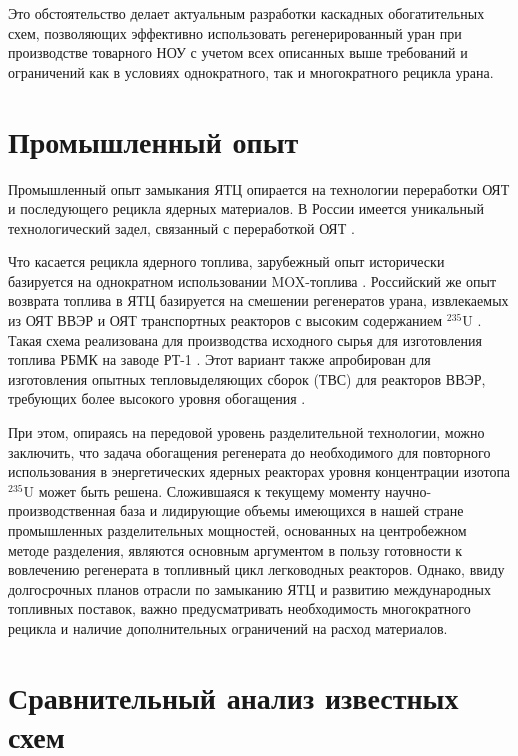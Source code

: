 Это обстоятельство делает актуальным разработки каскадных обогатительных схем, позволяющих эффективно использовать регенерированный уран при производстве товарного НОУ с учетом всех описанных выше требований и ограничений как в условиях однократного, так и многократного рецикла урана.

\section{Промышленный опыт}\label{sec:ch1/sec1}
Промышленный опыт замыкания ЯТЦ опирается на технологии переработки ОЯТ и последующего рецикла ядерных материалов.
В России имеется уникальный технологический задел, связанный с переработкой ОЯТ \cite{balihinSostoyaniiPerspektivahRazvitiya2018, efimenkoProblemyPerspektivyRazvitiya2017}.

Что касается рецикла ядерного топлива, зарубежный опыт исторически базируется на однократном использовании MOX-топлива \cite{international2003iaea}.
Российский же опыт возврата топлива в ЯТЦ базируется на смешении регенератов урана, извлекаемых из ОЯТ ВВЭР и ОЯТ транспортных реакторов с высоким содержанием $^{235}$U \cite{international2003iaea}.
Такая схема реализована для производства исходного сырья для изготовления топлива РБМК на заводе РТ-1 \cite{volkVozvratUranaIz2010}.
Этот вариант также апробирован для изготовления опытных тепловыделяющих сборок (ТВС) для реакторов ВВЭР, требующих более высокого уровня обогащения \cite{proselkovAnalizVozmozhnostiIspolzovaniya2003}.

При этом, опираясь на передовой уровень разделительной технологии, можно заключить, что задача обогащения регенерата до необходимого для повторного использования в энергетических ядерных реакторах уровня концентрации изотопа $^{235}$U может быть решена.
Сложившаяся к текущему моменту научно-производственная база и лидирующие объемы имеющихся в нашей стране промышленных разделительных мощностей, основанных на центробежном методе разделения, являются основным аргументом в пользу готовности к вовлечению регенерата в топливный цикл легководных реакторов.
Однако, ввиду долгосрочных планов отрасли по замыканию ЯТЦ и развитию международных топливных поставок, важно предусматривать необходимость  многократного рецикла и наличие дополнительных ограничений на расход материалов.

\section{Сравнительный анализ известных схем}

